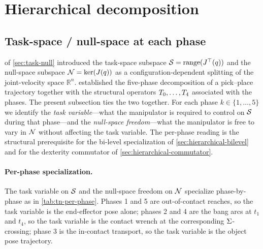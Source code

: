 \section{Hierarchical decomposition}
\label{sec:hierarchical}

\subsection{Task-space / null-space at each phase}
\label{sec:hierarchical-tn}

 of \cref{sec:task-null} introduced the
task-space subspace
$\mathcal{S} = \mathrm{range}(J^{\top}(q))$ and the null-space
subspace $\mathcal{N} = \ker(J(q))$ as a configuration-dependent
splitting of the joint-velocity space $\mathbb{R}^{n}$.
 established the five-phase decomposition
of a pick--place trajectory together with the structural
operators $T_{0}, \ldots, T_{4}$ associated with the
phases. The present subsection ties the two together. For each
phase $k \in \{1, \ldots, 5\}$ we identify the \emph{task
variable}---what the manipulator is required to control on $\mathcal{S}$
during that phase---and the \emph{null-space freedom}---what the
manipulator is free to vary in $\mathcal{N}$ without affecting the task
variable. The per-phase reading is the structural prerequisite
for the bi-level specialization of \cref{sec:hierarchical-bilevel}
and for the dexterity commutator of
\cref{sec:hierarchical-commutator}.

\paragraph{Per-phase specialization.}
The task variable on $\mathcal{S}$ and the null-space freedom on $\mathcal{N}$
specialize phase-by-phase as in \cref{tab:tn-per-phase}. Phases 1
and 5 are out-of-contact reaches, so the task variable is the
end-effector pose alone; phases 2 and 4 are the bang arcs at
$t_{1}$ and $t_{4}$, so the task variable is the contact wrench
at the corresponding $\Sigma$-crossing; phase 3 is the in-contact
transport, so the task variable is the object pose trajectory.

